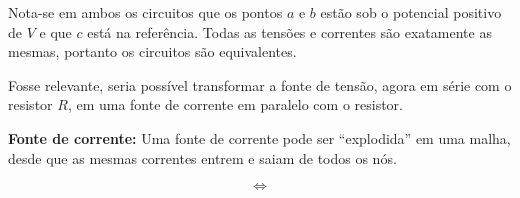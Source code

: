 \documentclass{article}
\numberwithin{equation}{section}
\newlength\Colsep
\begin{document}
\vspace{1mm}

Nota-se em ambos os circuitos que os pontos $a$ e $b$ estão sob o potencial positivo de $V$ e que $c$ está na referência. Todas as tensões e correntes são exatamente as mesmas, portanto os circuitos são equivalentes.

Fosse relevante, seria possível transformar a fonte de tensão, agora em série com o resistor $R$, em uma fonte de corrente em paralelo com o resistor.

\vspace{2mm}

\textbf{Fonte de corrente:} Uma fonte de corrente pode ser ``explodida'' em uma malha, desde que as mesmas correntes entrem e saiam de todos os nós.

\begin{center}
\noindent\begin{minipage}{0.9\textwidth}
\begin{minipage}[c][5cm][c]{\dimexpr0.45\textwidth-0.5\Colsep\relax}
    \begin{center}
    \end{center}
\end{minipage} \hfill
\begin{minipage}[c][5cm][c]{\dimexpr0.1\textwidth-0.5\Colsep\relax}
    $$\iff$$
\end{minipage} \hfill
\begin{minipage}[c][5cm][c]{\dimexpr0.45\textwidth-0.5\Colsep\relax}
    \begin{center}
    \end{center}
\end{minipage}
\end{minipage}
\end{center}
\end{document}
